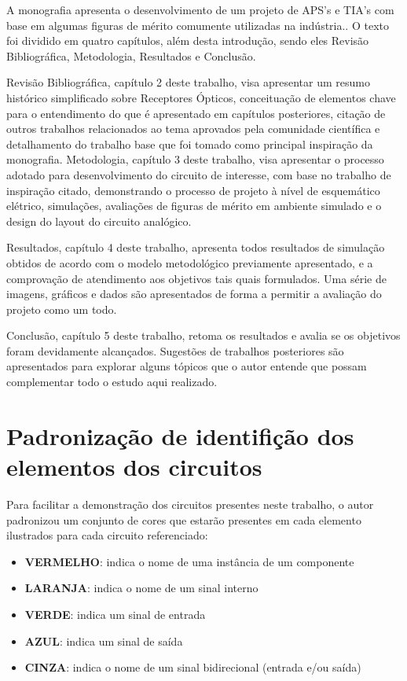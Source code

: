 A monografia apresenta o desenvolvimento de um projeto de APS's e TIA's com base em algumas figuras de mérito comumente utilizadas na indústria.. O texto foi dividido em quatro capítulos, além desta introdução, sendo eles Revisão Bibliográfica, Metodologia, Resultados e Conclusão.

Revisão Bibliográfica, capítulo 2 deste trabalho, visa apresentar um resumo histórico simplificado sobre Receptores Ópticos, conceituação de elementos chave para o entendimento do que é apresentado em capítulos posteriores, citação de outros trabalhos relacionados ao tema aprovados pela comunidade científica e detalhamento do trabalho base que foi tomado como principal inspiração da monografia.
Metodologia, capítulo 3 deste trabalho, visa apresentar o processo adotado para desenvolvimento do circuito de interesse, com base no trabalho de inspiração citado, demonstrando o processo de projeto à nível de esquemático elétrico, simulações, avaliações de figuras de mérito em ambiente simulado e o design do layout do circuito analógico.

Resultados, capítulo 4 deste trabalho, apresenta todos resultados de simulação obtidos de acordo com o modelo metodológico previamente apresentado, e a comprovação de atendimento aos objetivos tais quais formulados. Uma série de imagens, gráficos e dados são apresentados de forma a permitir a avaliação do projeto como um todo.

Conclusão, capítulo 5 deste trabalho, retoma os resultados e avalia se os objetivos foram devidamente alcançados. Sugestões de trabalhos posteriores são apresentados para explorar alguns tópicos que o autor entende que possam complementar todo o estudo aqui realizado.

\section{Padronização de identifição dos elementos dos circuitos}
\label{section:padrao_sinais}

Para facilitar a demonstração dos circuitos presentes neste trabalho, o autor padronizou um conjunto de cores que estarão presentes em cada elemento ilustrados para cada circuito referenciado:

\begin{itemize}
    \item \textbf{\color{red}VERMELHO}: indica o nome de uma inst\^ancia de um componente
    \item \textbf{\color{orange}LARANJA}: indica o nome de um sinal interno
    \item \textbf{\color{green}VERDE}: indica um sinal de entrada
    \item \textbf{\color{blue}AZUL}: indica um sinal de sa\'ida
    \item \textbf{\color{gray}CINZA}: indica o nome de um sinal bidirecional (entrada e/ou sa\'ida)
\end{itemize}